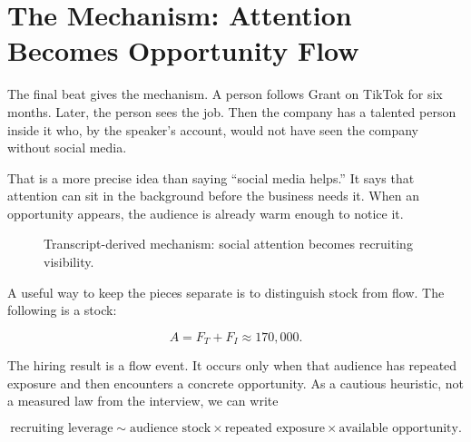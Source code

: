 \section{The Mechanism: Attention Becomes Opportunity Flow}

The final beat gives the mechanism. A person follows Grant on TikTok for six months. Later, the person sees the job. Then the company has a talented person inside it who, by the speaker's account, would not have seen the company without social media.

That is a more precise idea than saying ``social media helps.'' It says that attention can sit in the background before the business needs it. When an opportunity appears, the audience is already warm enough to notice it.

\begin{figure}
\centering
{}
\caption{Transcript-derived mechanism: social attention becomes recruiting visibility.}
\end{figure}

A useful way to keep the pieces separate is to distinguish stock from flow. The following is a stock:

\begin{equation}
A = F_T + F_I \approx 170{,}000.
\end{equation}

The hiring result is a flow event. It occurs only when that audience has repeated exposure and then encounters a concrete opportunity. As a cautious heuristic, not a measured law from the interview, we can write

\begin{equation}
\text{recruiting leverage}
\sim
\text{audience stock}
\times
\text{repeated exposure}
\times
\text{available opportunity}.
\end{equation}

